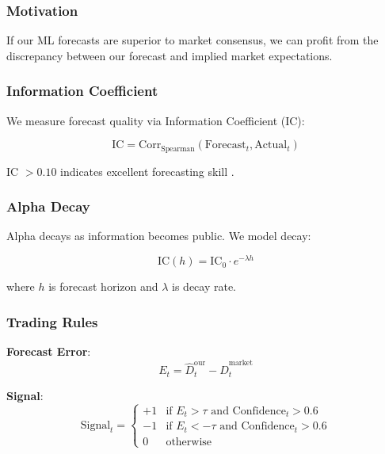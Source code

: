 \documentclass[12pt,a4paper]{article}
\begin{document}
\subsubsection{Motivation}

If our ML forecasts are superior to market consensus, we can profit from the discrepancy between our forecast and implied market expectations.

\subsubsection{Information Coefficient}

We measure forecast quality via Information Coefficient (IC):

\begin{equation}
\text{IC} = \text{Corr}_{\text{Spearman}}(\text{Forecast}_t, \text{Actual}_t)
\end{equation}

IC $> 0.10$ indicates excellent forecasting skill \citep{grinold1999active}.

\subsubsection{Alpha Decay}

Alpha decays as information becomes public. We model decay:

\begin{equation}
\text{IC}(h) = \text{IC}_0 \cdot e^{-\lambda h}
\end{equation}

where $h$ is forecast horizon and $\lambda$ is decay rate.

\subsubsection{Trading Rules}

\textbf{Forecast Error}:
\begin{equation}
E_t = \hat{D}_t^{\text{our}} - \hat{D}_t^{\text{market}}
\end{equation}

\textbf{Signal}:
\begin{equation}
\text{Signal}_t = \begin{cases}
+1 & \text{if } E_t > \tau \text{ and } \text{Confidence}_t > 0.6 \\
-1 & \text{if } E_t < -\tau \text{ and } \text{Confidence}_t > 0.6 \\
0 & \text{otherwise}
\end{cases}
\end{equation}
\end{document}
